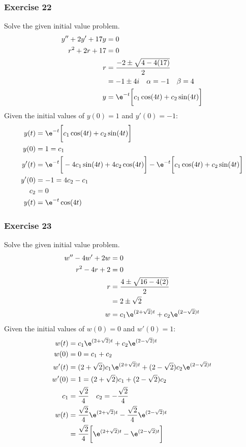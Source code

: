 \documentclass{math}
\begin{document}
\subsubsection*{Exercise 22}
Solve the given initial value problem.
\begin{align*}
  y''+2y'+17y &= 0 \\
  r^2+2r+17 &= 0 \\
  r &= \frac{-2\pm\sqrt{4-4(17)}}{2} \\
  &= -1\pm4i \quad \alpha = -1 \quad \beta = 4 \\
  y &= \e^{-t}\bigg[c_1\cos(4t)+c_2\sin(4t)\bigg]
\end{align*}
Given the initial values of \( y(0) = 1 \) and \( y'(0) = -1 \):
\begin{align*}
  y(t) &= \e^{-t}\bigg[c_1\cos(4t)+c_2\sin(4t)\bigg] \\
  y(0) &= 1 = c_1 \\
  y'(t) &= \e^{-t}\bigg[-4c_1\sin(4t)+4c_2\cos(4t)\bigg]-
    \e^{-t}\bigg[c_1\cos(4t)+c_2\sin(4t)\bigg] \\
  y'(0) &= -1 = 4c_2-c_1 \\
  c_2 &= 0 \\
  y(t) &= \e^{-t}\cos(4t)
\end{align*}

\subsubsection*{Exercise 23}
Solve the given initial value problem.
\begin{align*}
  w''-4w'+2w &= 0 \\
  r^2-4r+2 &= 0 \\
  r &= \frac{4\pm\sqrt{16-4(2)}}{2} \\
  &= 2\pm\sqrt{2} \\
  w &= c_1\e^{(2+\sqrt{2})t}+c_2\e^{(2-\sqrt{2})t}
\end{align*}
Given the initial values of \( w(0) = 0 \) and \( w'(0) = 1 \):
\begin{align*}
  w(t) &= c_1\e^{(2+\sqrt{2})t}+c_2\e^{(2-\sqrt{2})t} \\
  w(0) &= 0 = c_1+c_2 \\
  w'(t) &= (2+\sqrt{2})c_1\e^{(2+\sqrt{2})t}+
    (2-\sqrt{2})c_2\e^{(2-\sqrt{2})t} \\
  w'(0) &= 1 = (2+\sqrt{2})c_1+(2-\sqrt{2})c_2 \\
  c_1 &= \frac{\sqrt{2}}{4} \quad c_2 = -\frac{\sqrt{2}}{4} \\
  w(t) &= \frac{\sqrt{2}}{4}\e^{(2+\sqrt{2})t}-
    \frac{\sqrt{2}}{4}\e^{(2-\sqrt{2})t} \\
  &= \frac{\sqrt{2}}{4}\bigg[\e^{(2+\sqrt{2})t}-\e^{(2-\sqrt{2})t}\bigg]
\end{align*}
\end{document}
